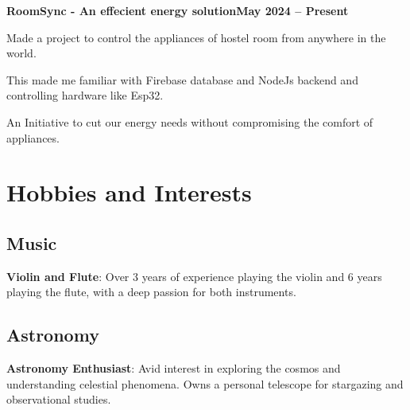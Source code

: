 \documentclass[letterpaper,10pt]{article}
\newcommand{\heading}[2]{
  \hspace{10pt}#1\hfill#2\\
}
\newcommand{\headingBf}[2]{
  \heading{\textbf{#1}}{\textbf{#2}}
}
\newenvironment{resume_list}{
  \vspace{-7pt}
  \begin{itemize}[itemsep=-2px, parsep=1pt, leftmargin=30pt]
}{
  \end{itemize}
}
\begin{document}
  \headingBf{RoomSync - An effecient energy solution}{May 2024 -- Present}
  \begin{resume_list}
    \item Made a project to control the appliances of hostel room from anywhere in the world.
    \item This made me familiar with Firebase database and NodeJs backend and controlling hardware like Esp32.
    \item An Initiative to cut our energy needs without compromising the comfort of appliances.
  \end{resume_list}


 \section{Hobbies and Interests}

\subsection*{Music}
\textbf{Violin and Flute}: Over 3 years of experience playing the violin and 6 years playing the flute, with a deep passion for both instruments.

\vspace{5pt}

\subsection*{Astronomy}
\textbf{Astronomy Enthusiast}: Avid interest in exploring the cosmos and understanding celestial phenomena. Owns a personal telescope for stargazing and observational studies.

    
\end{document}
